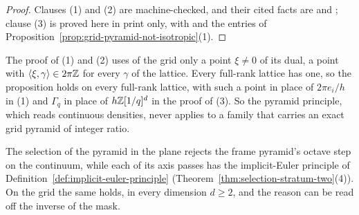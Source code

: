 \begin{proof}
Clauses (1) and (2) are machine-checked, and their cited facts are  and ;
clause (3) is proved here in print only, with  and the entries of
Proposition~\ref{prop:grid-pyramid-not-isotropic}(1).
\end{proof}

The proof of (1) and (2) uses of the grid only a point $\xi \ne 0$ of its dual, a point with
$\langle\xi, \gamma\rangle \in 2\pi\mathbb{Z}$ for every $\gamma$ of the lattice. Every full-rank lattice
has one, so the proposition holds on every full-rank lattice, with such a point in place of
$2\pi e_i/h$ in (1) and $\Gamma_q$ in place of $h\mathbb{Z}[1/q]^d$ in the proof of (3). So the pyramid principle, which reads continuous densities, never applies to a
family that carries an exact grid pyramid of integer ratio.

The selection of the \Matern{} pyramid in the plane rejects the frame pyramid's octave step on
the continuum, while each of its axis passes has the implicit-Euler principle of
Definition~\ref{def:implicit-euler-principle} (Theorem~\ref{thm:selection-stratum-two}(4)). On the
grid the same holds, in every dimension $d \ge 2$, and the reason can be read off the inverse of
the mask.

